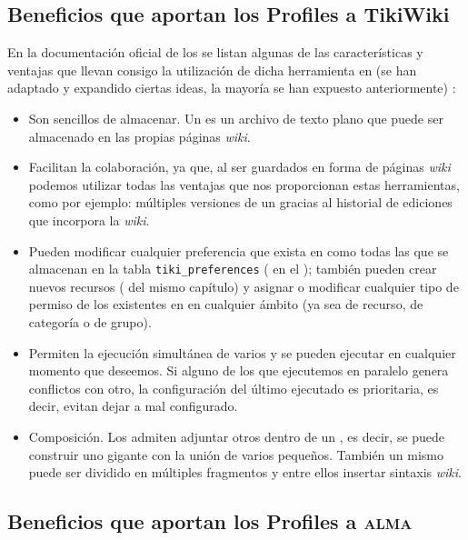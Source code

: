 \subsection{Beneficios que aportan los Profiles a TikiWiki}

En la documentación oficial de los \profiles{} se listan algunas de las características y ventajas que llevan consigo la utilización de dicha herramienta en \tiki{} (se han adaptado y expandido ciertas ideas, la mayoría se han expuesto anteriormente) \cite{web:explicacion-profiles}:

\begin{itemize}
\item Son sencillos de almacenar. Un \profile{} es un archivo de texto plano que puede ser almacenado en las propias páginas \textit{wiki}.

\item Facilitan la colaboración, ya que, al ser guardados en forma de páginas \textit{wiki} podemos utilizar todas las ventajas que nos proporcionan estas herramientas, como por ejemplo: múltiples versiones de un \profile{} gracias al historial de ediciones que incorpora la \textit{wiki}.

\item Pueden modificar cualquier preferencia que exista en \tiki{} como todas las que se almacenan en la tabla \texttt{tiki\_preferences} ( en el ); también pueden crear nuevos recursos ( del mismo capítulo) y asignar o modificar cualquier tipo de permiso de los existentes en \tiki{} en cualquier ámbito (ya sea de recurso, de categoría o de grupo).

\item Permiten la ejecución simultánea de varios \profiles{} y se pueden ejecutar en cualquier momento que deseemos. Si alguno de los \profiles{} que ejecutemos en paralelo genera conflictos con otro, la configuración del último ejecutado es prioritaria, es decir, evitan dejar a \tiki{} mal configurado.

\item Composición. Los \profiles{} admiten adjuntar otros \profiles{} dentro de un \profile{}, es decir, se puede construir uno gigante con la unión de varios pequeños. También un mismo \profile{} puede ser dividido en múltiples fragmentos y entre ellos insertar sintaxis \textit{wiki}.
\end{itemize}

\subsection{Beneficios que aportan los Profiles a \textsc{alma}}

